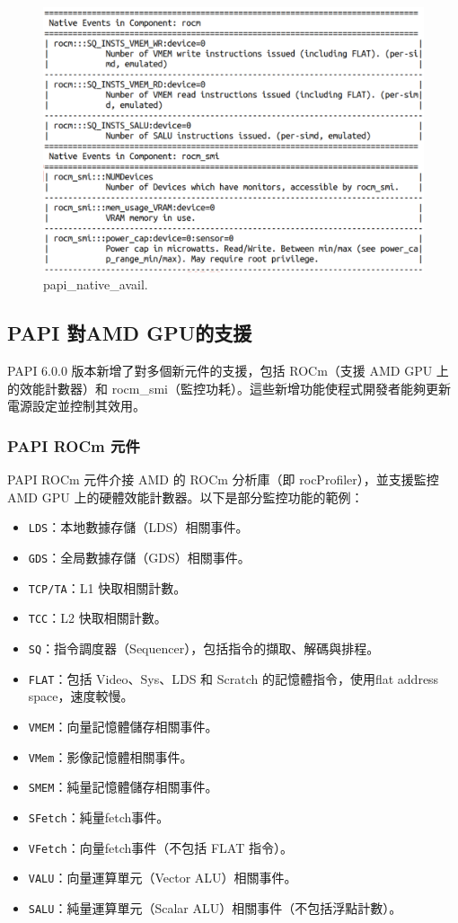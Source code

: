 \begin{figure}
    \centering
    \includegraphics[width=0.9\linewidth]{FileAusiliari/Screenshots/Figure13-4.png}
    \caption{papi\_native\_avail.}
    \label{fig:PAPI4}
\end{figure}


\subsection{PAPI 對AMD GPU的支援}

PAPI 6.0.0 版本新增了對多個新元件的支援，包括 ROCm（支援 AMD GPU 上的效能計數器）和 rocm\_smi（監控功耗）。這些新增功能使程式開發者能夠更新電源設定並控制其效用。


\subsubsection{PAPI ROCm 元件}

PAPI ROCm 元件介接 AMD 的 ROCm 分析庫（即 rocProfiler），並支援監控 AMD GPU 上的硬體效能計數器。以下是部分監控功能的範例：

\begin{itemize}
    \item \texttt{LDS}：本地數據存儲（LDS）相關事件。
    \item \texttt{GDS}：全局數據存儲（GDS）相關事件。
    \item \texttt{TCP/TA}：L1 快取相關計數。
    \item \texttt{TCC}：L2 快取相關計數。
    \item \texttt{SQ}：指令調度器（Sequencer），包括指令的擷取、解碼與排程。
    \item \texttt{FLAT}：包括 Video、Sys、LDS 和 Scratch 的記憶體指令，使用flat address space，速度較慢。
    \item \texttt{VMEM}：向量記憶體儲存相關事件。
    \item \texttt{VMem}：影像記憶體相關事件。
    \item \texttt{SMEM}：純量記憶體儲存相關事件。
    \item \texttt{SFetch}：純量fetch事件。    
    \item \texttt{VFetch}：向量fetch事件（不包括 FLAT 指令）。
    \item \texttt{VALU}：向量運算單元（Vector ALU）相關事件。
    \item \texttt{SALU}：純量運算單元（Scalar ALU）相關事件（不包括浮點計數）。
\end{itemize}

